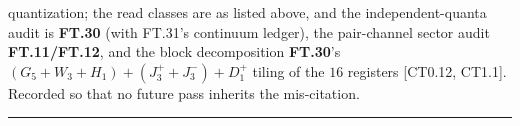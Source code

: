 \begin{definition}
quantization; the read classes are as listed above, and the independent-quanta audit is \textbf{FT.30} (with FT.31's continuum ledger), the pair-channel sector audit \textbf{FT.11/FT.12}, and the block decomposition \textbf{FT.30}'s $(G_5+W_3+H_1)+(J^+_3+J^-_3)+D^+_1$ tiling of the $16$ registers [CT0.12, CT1.1]. Recorded so that no future pass inherits the mis-citation.

\vspace{2pt}\noindent\rule{\textwidth}{0.4pt}\vspace{2pt}

\end{definition}

\begin{theorem}\label{tag:FT-82}

\end{theorem}
